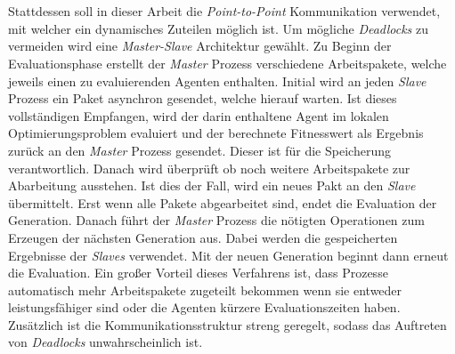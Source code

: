 \\\\
Stattdessen soll in dieser Arbeit die \emph{Point-to-Point} Kommunikation verwendet, mit welcher ein dynamisches Zuteilen möglich ist. Um mögliche \emph{Deadlocks} zu vermeiden wird eine \emph{Master-Slave} Architektur gewählt. Zu Beginn der Evaluationsphase erstellt der \emph{Master} Prozess verschiedene Arbeitspakete, welche jeweils einen zu evaluierenden Agenten enthalten. Initial wird an jeden \emph{Slave} Prozess ein Paket asynchron gesendet, welche hierauf warten. Ist dieses vollständigen Empfangen, wird der darin enthaltene Agent im lokalen Optimierungsproblem evaluiert und der berechnete Fitnesswert als Ergebnis zurück an den \emph{Master} Prozess gesendet. Dieser ist für die Speicherung verantwortlich. Danach wird überprüft ob noch weitere Arbeitspakete zur Abarbeitung ausstehen. Ist dies der Fall, wird ein neues Pakt an den \emph{Slave} übermittelt. Erst wenn alle Pakete abgearbeitet sind, endet die Evaluation der Generation. Danach führt der \emph{Master} Prozess die nötigten Operationen zum Erzeugen der nächsten Generation aus. Dabei werden die gespeicherten Ergebnisse der \emph{Slaves} verwendet. Mit der neuen Generation beginnt dann erneut die Evaluation. Ein großer Vorteil dieses Verfahrens ist, dass Prozesse automatisch mehr Arbeitspakete zugeteilt bekommen wenn sie entweder leistungsfähiger sind oder die Agenten kürzere Evaluationszeiten haben. Zusätzlich ist die Kommunikationsstruktur streng geregelt, sodass das Auftreten von \emph{Deadlocks} unwahrscheinlich ist.
\\\\
